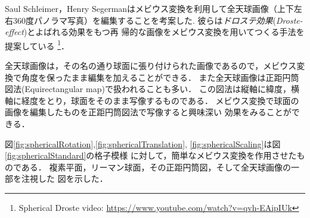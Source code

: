 Saul Schleimer，Henry Segermanはメビウス変換を利用して全天球画像（上下左
右360度パノラマ写真）を編集することを考案した\cite{bridges2016-15}.
彼らは\emph{ドロステ効果}(\textit{Droste-effect})とよばれる効果をもつ再
帰的な画像をメビウス変換を用いてつくる手法を提案している
\footnote{Spherical Droste video:
\url{https://www.youtube.com/watch?v=qvh-EAipIUk}}．

全天球画像は，その名の通り球面に張り付けられた画像であるので，メビウス変
換で角度を保ったまま編集を加えることができる．
また全天球画像は正距円筒図法(Equirectangular map)で扱われることも多い．
この図法は縦軸に緯度，横軸に経度をとり，球面をそのまま写像するものである．
メビウス変換で球面の画像を編集したものを正距円筒図法で写像すると興味深い
効果をみることができる．

図\ref{fig:sphericalRotation},\ref{fig:sphericalTranslation},
\ref{fig:sphericalScaling}は図\ref{fig:sphericalStandard}の格子模様
に対して，簡単なメビウス変換を作用させたものである．
複素平面，リーマン球面，その正距円筒図，そして全天球画像の一部を注視した
図を示した．

